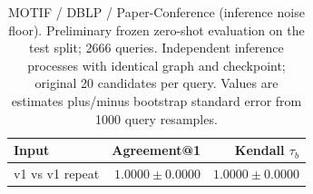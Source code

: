 \begin{table}[t]
\centering
\small
\begin{tabular}{lrr}
\toprule
Input & Agreement@1 & Kendall $\tau_b$ \\
\midrule
v1 vs v1 repeat & $1.0000 \pm 0.0000$ & $1.0000 \pm 0.0000$ \\
\bottomrule
\end{tabular}
\caption{MOTIF / DBLP / Paper-Conference (inference noise floor). Preliminary frozen zero-shot evaluation on the test split; 2666 queries. Independent inference processes with identical graph and checkpoint; original 20 candidates per query. Values are estimates plus/minus bootstrap standard error from 1000 query resamples.}
\label{tab:motif-paper_conference-noise}
\end{table}
